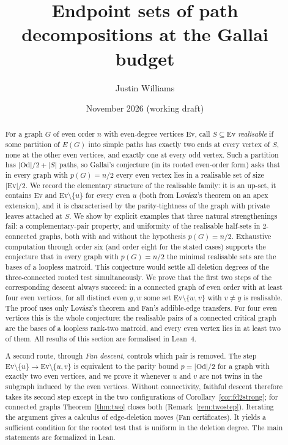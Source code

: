 \documentclass[11pt]{amsart}
\title{Endpoint sets of path decompositions at the Gallai budget}
\author{Justin Williams}
\date{November 2026 (working draft)}
\theoremstyle{definition}
\newcommand{\Ev}{\mathrm{Ev}}
\newcommand{\Od}{\mathrm{Od}}
\begin{document}
\begin{abstract}
For a graph $G$ of even order $n$ with even-degree vertices $\Ev$, call $S\subseteq\Ev$
\emph{realisable} if some partition of $E(G)$ into simple paths has exactly two ends at every vertex
of $S$, none at the other even vertices, and exactly one at every odd vertex. Such a partition has
$|\Od|/2+|S|$ paths, so Gallai's conjecture (in its rooted even-order form) asks that in every graph
with $p(G)=n/2$ every even vertex lies in a realisable set of size $|\Ev|/2$.
We record the elementary structure of the realisable family: it is an up-set, it contains $\Ev$ and
$\Ev\setminus\{u\}$ for every even $u$ (both from Lov\'asz's theorem on an apex extension), and it is
characterised by the parity-tightness of the graph with private leaves attached at $S$.
We show by explicit examples that three natural strengthenings fail: a complementary-pair property,
and uniformity of the realisable half-sets in $2$-connected graphs, both with and without the
hypothesis $p(G)=n/2$. Exhaustive computation through order six (and order eight for the stated
cases) supports the conjecture that in every graph with $p(G)=n/2$ the minimal realisable sets are
the bases of a loopless matroid. This conjecture would settle all deletion degrees of the
three-connected rooted test simultaneously.
We prove that the first two steps of the corresponding descent always succeed: in a connected
graph of even order with at least four even vertices, for all distinct even $y,w$ some set
$\Ev\setminus\{w,v\}$ with $v\ne y$ is realisable. The proof uses only Lov\'asz's theorem and Fan's
addible-edge transfers. For four even vertices this is the whole conjecture: the realisable pairs
of a connected critical graph are the bases of a loopless rank-two matroid, and every even vertex
lies in at least two of them. All results of this section are formalised in Lean~4.

A second route, through \emph{Fan descent}, controls which pair is removed. The step
$\Ev\setminus\{u\}\to\Ev\setminus\{u,v\}$ is equivalent to the parity bound $p=|\Od|/2$ for a
graph with exactly two even vertices, and we prove it whenever $u$ and $v$ are not twins in the
subgraph induced by the even vertices. Without connectivity, faithful descent therefore takes its
second step except in the two configurations of Corollary~\ref{cor:fd2strong}; for connected
graphs Theorem~\ref{thm:two} closes both (Remark~\ref{rem:twostep}).
Iterating the argument gives a calculus of edge-deletion moves (Fan certificates). It yields a
sufficient condition for the rooted test that is uniform in the deletion degree. The main
statements are formalized in Lean.


\end{abstract}
\end{document}
